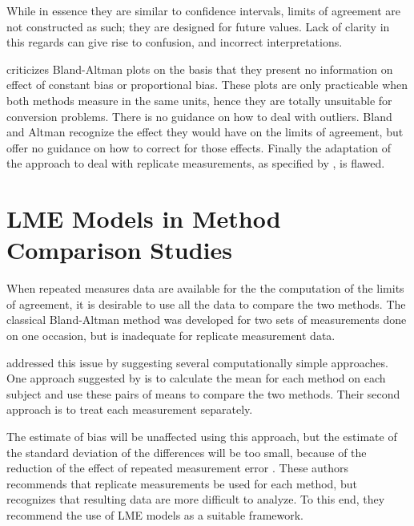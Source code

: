 \documentclass[12pt, a4paper]{report}
\theoremstyle{plain}
\theoremstyle{definition}
\theoremstyle{remark}
\begin{document}
While in essence they are similar to confidence intervals, limits of agreement are not constructed as such; they are designed for future values. Lack of clarity in this regards can give rise to confusion, and incorrect interpretations.

\citet{ludbrook97,ludbrook02} criticizes Bland-Altman plots on the basis that they present no information on effect of constant bias or proportional bias. These plots are only practicable when both methods measure in the same units, hence they are totally
unsuitable for conversion problems. There is no guidance on how to deal with outliers. Bland and Altman recognize the effect they would have on the limits of agreement, but offer no guidance on how to correct for those effects. Finally the adaptation of the approach to deal with replicate measurements, as specified by \citet{BA99}, is flawed.


\section{LME Models in Method Comparison Studies}
When repeated measures data are available for the the computation of the limits of agreement, it is desirable to use all the data to compare the two methods. The classical Bland-Altman method was developed for two sets of measurements done on one occasion, but is inadequate for replicate measurement data. 

\citet{BA99} addressed this issue by suggesting several computationally simple approaches.  One approach suggested by \citet{BA99} is to calculate the mean for each method on each subject and use these pairs of means to compare the two methods. Their second approach is to treat each measurement separately. 
	
The estimate of bias will be unaffected using this approach, but the estimate of the standard deviation of the differences will be too small, because of the reduction of the effect of repeated measurement error \citep{BXC2004,BXC2008}. These authors recommends that replicate measurements be used for each method, but recognizes that resulting data are more difficult to analyze. To this end, they recommend the use of LME models as a suitable framework.
	
\end{document}
